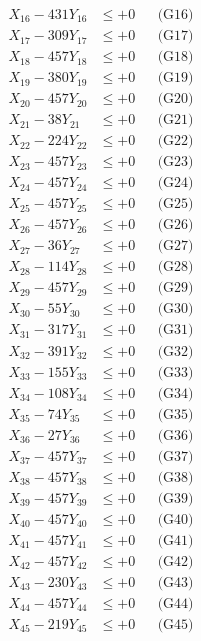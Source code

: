 \documentclass[a4paper,10pt]{article}
\begin{document}
{\begin{align}
X_{16} - 431Y_{16} &\leq +0 && \text{(G16)} \\
X_{17} - 309Y_{17} &\leq +0 && \text{(G17)} \\
X_{18} - 457Y_{18} &\leq +0 && \text{(G18)} \\
X_{19} - 380Y_{19} &\leq +0 && \text{(G19)} \\
X_{20} - 457Y_{20} &\leq +0 && \text{(G20)} \\
\allowbreak
X_{21} - 38Y_{21} &\leq +0 && \text{(G21)} \\
X_{22} - 224Y_{22} &\leq +0 && \text{(G22)} \\
X_{23} - 457Y_{23} &\leq +0 && \text{(G23)} \\
X_{24} - 457Y_{24} &\leq +0 && \text{(G24)} \\
X_{25} - 457Y_{25} &\leq +0 && \text{(G25)} \\
X_{26} - 457Y_{26} &\leq +0 && \text{(G26)} \\
X_{27} - 36Y_{27} &\leq +0 && \text{(G27)} \\
X_{28} - 114Y_{28} &\leq +0 && \text{(G28)} \\
X_{29} - 457Y_{29} &\leq +0 && \text{(G29)} \\
X_{30} - 55Y_{30} &\leq +0 && \text{(G30)} \\
\allowbreak
X_{31} - 317Y_{31} &\leq +0 && \text{(G31)} \\
X_{32} - 391Y_{32} &\leq +0 && \text{(G32)} \\
X_{33} - 155Y_{33} &\leq +0 && \text{(G33)} \\
X_{34} - 108Y_{34} &\leq +0 && \text{(G34)} \\
X_{35} - 74Y_{35} &\leq +0 && \text{(G35)} \\
X_{36} - 27Y_{36} &\leq +0 && \text{(G36)} \\
X_{37} - 457Y_{37} &\leq +0 && \text{(G37)} \\
X_{38} - 457Y_{38} &\leq +0 && \text{(G38)} \\
X_{39} - 457Y_{39} &\leq +0 && \text{(G39)} \\
X_{40} - 457Y_{40} &\leq +0 && \text{(G40)} \\
\allowbreak
X_{41} - 457Y_{41} &\leq +0 && \text{(G41)} \\
X_{42} - 457Y_{42} &\leq +0 && \text{(G42)} \\
X_{43} - 230Y_{43} &\leq +0 && \text{(G43)} \\
X_{44} - 457Y_{44} &\leq +0 && \text{(G44)} \\
X_{45} - 219Y_{45} &\leq +0 && \text{(G45)} \\

\end{align}}
\end{document}

